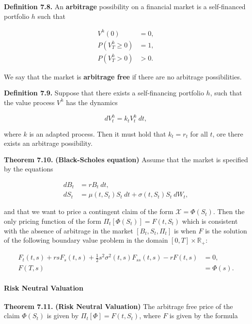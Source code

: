 \documentclass[
]{article}
\begin{document}
\textbf{Definition 7.8.} An \textbf{arbitrage} possibility on a
financial market is a self-financed portfolio \(h\) such that

\begin{align*}
V^h(0)&=0,\\
P(V_T^h\ge0)&=1,\\
P(V_T^h>0)&>0.
\end{align*}

We say that the market is \textbf{arbitrage free} if there are no
arbitrage possibilities.

\textbf{Definition 7.9.} Suppose that there exists a self-financing
portfolio \(h\), such that the value process \(V^h\) has the dynamics

\[
d V_t^h=k_tV_t^h\ dt,
\]

where \(k\) is an adapted process. Then it must hold that \(k_t=r_t\)
for all \(t\), ore there exists an arbitrage possibility.

\textbf{Theorem 7.10.} \textbf{(Black-Scholes equation)} Assume that the
market is specified by the equations

\begin{align*}
dB_t&=rB_t\ dt,\\
dS_t&=\mu(t,S_t) S_t\ dt+\sigma(t,S_t)S_t\ dW_t,
\end{align*}

and that we want to price a contingent claim of the form
\(\mathcal{X}=\Phi(S_t)\). Then the only pricing function of the form
\(\Pi_t[\Phi(S_t)]=F(t,S_t)\) which is consistent with the absence of
arbitrage in the market \([B_t,S_t,\Pi_t]\) is when \(F\) is the
solution of the following boundary value problem in the domain
\([0,T]\times\mathbb{R}_+\):

\begin{align*}
F_t(t,s)+rsF_s(t,s)+\frac{1}{2}s^2\sigma^2(t,s)F_{ss}(t,s)-rF(t,s)&=0,\\
F(T,s)&=\Phi(s).
\end{align*}

\hypertarget{risk-neutral-valuation-1}{%
\paragraph{Risk Neutral Valuation}\label{risk-neutral-valuation-1}}

\textbf{Theorem 7.11.} \textbf{(Risk Neutral Valuation)} The arbitrage
free price of the claim \(\Phi(S_t)\) is given by
\(\Pi_t[\Phi]=F(t,S_t)\), where \(F\) is given by the formula
\end{document}

